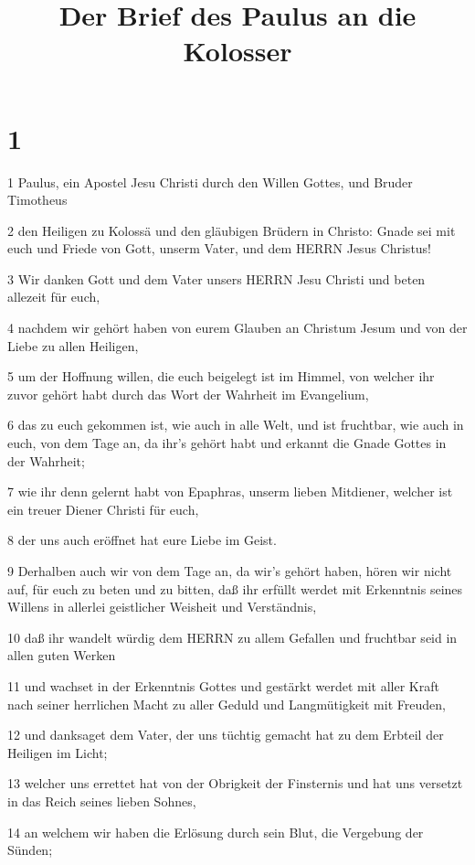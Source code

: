 

\title{Der Brief des Paulus an die Kolosser}


\chapter{1}

\par 1 Paulus, ein Apostel Jesu Christi durch den Willen Gottes, und Bruder Timotheus
\par 2 den Heiligen zu Kolossä und den gläubigen Brüdern in Christo: Gnade sei mit euch und Friede von Gott, unserm Vater, und dem HERRN Jesus Christus!
\par 3 Wir danken Gott und dem Vater unsers HERRN Jesu Christi und beten allezeit für euch,
\par 4 nachdem wir gehört haben von eurem Glauben an Christum Jesum und von der Liebe zu allen Heiligen,
\par 5 um der Hoffnung willen, die euch beigelegt ist im Himmel, von welcher ihr zuvor gehört habt durch das Wort der Wahrheit im Evangelium,
\par 6 das zu euch gekommen ist, wie auch in alle Welt, und ist fruchtbar, wie auch in euch, von dem Tage an, da ihr's gehört habt und erkannt die Gnade Gottes in der Wahrheit;
\par 7 wie ihr denn gelernt habt von Epaphras, unserm lieben Mitdiener, welcher ist ein treuer Diener Christi für euch,
\par 8 der uns auch eröffnet hat eure Liebe im Geist.
\par 9 Derhalben auch wir von dem Tage an, da wir's gehört haben, hören wir nicht auf, für euch zu beten und zu bitten, daß ihr erfüllt werdet mit Erkenntnis seines Willens in allerlei geistlicher Weisheit und Verständnis,
\par 10 daß ihr wandelt würdig dem HERRN zu allem Gefallen und fruchtbar seid in allen guten Werken
\par 11 und wachset in der Erkenntnis Gottes und gestärkt werdet mit aller Kraft nach seiner herrlichen Macht zu aller Geduld und Langmütigkeit mit Freuden,
\par 12 und danksaget dem Vater, der uns tüchtig gemacht hat zu dem Erbteil der Heiligen im Licht;
\par 13 welcher uns errettet hat von der Obrigkeit der Finsternis und hat uns versetzt in das Reich seines lieben Sohnes,
\par 14 an welchem wir haben die Erlösung durch sein Blut, die Vergebung der Sünden;
